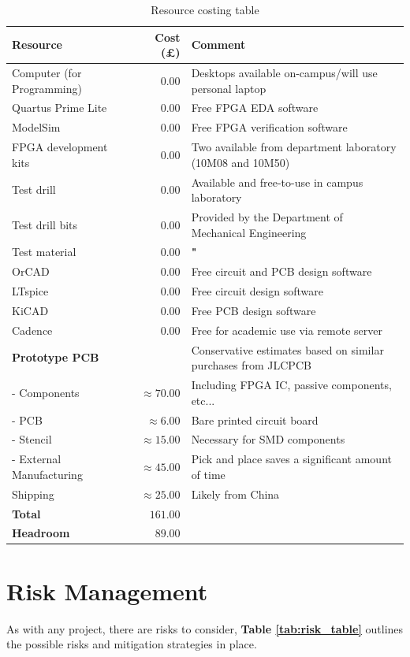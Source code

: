 \documentclass{article}
\begin{document}
\begin{table}[!ht]
    \centering
    \begin{tabular}{lrl}
        \textbf{Resource} & \textbf{Cost (£)} & \textbf{Comment} \\ \hline
        Computer (for Programming) & $0.00$ & Desktops available on-campus/will use personal laptop \\
        Quartus Prime Lite & $0.00$ & Free FPGA EDA software \\ 
        ModelSim & $0.00$ & Free FPGA verification software \\
        FPGA development kits & $0.00$ & Two available from department laboratory (10M08 and 10M50) \\ 
        Test drill & $0.00$ & Available and free-to-use in campus laboratory \\
        Test drill bits & $0.00$ & Provided by the Department of Mechanical Engineering \\
        Test material & $0.00$ & \textbf{"} \\
        OrCAD & $0.00$ & Free circuit and PCB design software \\
        LTspice & $0.00$ & Free circuit design software \\
        KiCAD & $0.00$ & Free PCB design software \\ 
        Cadence & $0.00$ & Free for academic use via remote server \\ 
        \textbf{Prototype PCB} & & Conservative estimates based on similar purchases from JLCPCB \\
        - Components & $\approx70.00$ & Including FPGA IC, passive components, etc... \\
        - PCB & $\approx6.00$ & Bare printed circuit board \\
        - Stencil & $\approx15.00$ & Necessary for SMD components \\
        - External Manufacturing & $\approx45.00$ & Pick and place saves a significant amount of time \\
         Shipping & $\approx25.00$ & Likely from China \\ \hline 
        \textbf{Total} & $161.00$ & \\
        \textbf{Headroom} & $89.00$ &
    \end{tabular}
    \caption{Resource costing table}
    \label{tab:costing_table}
\end{table}

\section{Risk Management}
As with any project, there are risks to consider, \textbf{Table \ref{tab:risk_table}} outlines the possible risks and mitigation strategies in place.
\end{document}
